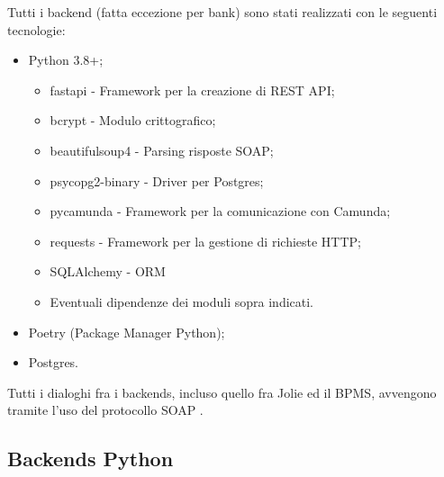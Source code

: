 \documentclass[11pt]{article} %
\begin{document}
Tutti i backend (fatta eccezione per bank) sono stati realizzati con le seguenti tecnologie:
\begin{itemize}
\item Python 3.8+;
\begin{itemize}
\item fastapi - Framework per la creazione di REST API;
\item bcrypt - Modulo crittografico;
\item beautifulsoup4 - Parsing risposte SOAP;
\item psycopg2-binary - Driver per Postgres;
\item pycamunda - Framework per la comunicazione con Camunda;
\item requests - Framework per la gestione di richieste HTTP;
\item SQLAlchemy - ORM
\item Eventuali dipendenze dei moduli sopra indicati.
\end{itemize}
\item Poetry (Package Manager Python);
\item Postgres.
\end{itemize}
Tutti i dialoghi fra i backends, incluso quello fra Jolie ed il BPMS, avvengono tramite l'uso del protocollo SOAP .

\subsection{Backends Python}
\end{document}
